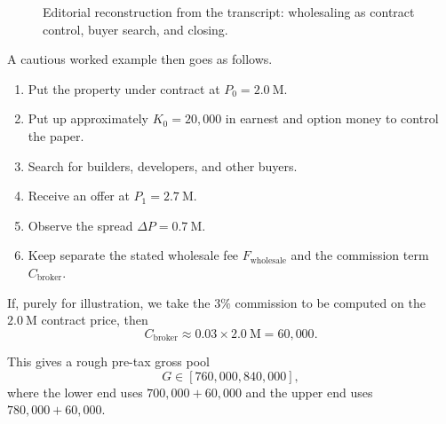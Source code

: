 \begin{figure}[h]
\centering
{}
\caption{Editorial reconstruction from the transcript: wholesaling as contract control, buyer search, and closing.}
\end{figure}

A cautious worked example then goes as follows.
\begin{enumerate}
\item Put the property under contract at \(P_0=2.0\ \mathrm{M}\).
\item Put up approximately \(K_0=20{,}000\) in earnest and option money to control the paper.
\item Search for builders, developers, and other buyers.
\item Receive an offer at \(P_1=2.7\ \mathrm{M}\).
\item Observe the spread \(\Delta P=0.7\ \mathrm{M}\).
\item Keep separate the stated wholesale fee \(F_{\mathrm{wholesale}}\) and the commission term \(C_{\mathrm{broker}}\).
\end{enumerate}

If, purely for illustration, we take the \(3\%\) commission to be computed on the \(2.0\ \mathrm{M}\) contract price, then
\begin{equation}
C_{\mathrm{broker}} \approx 0.03\times 2.0\ \mathrm{M} = 60{,}000.
\end{equation}

This gives a rough pre-tax gross pool
\begin{equation}
G \in [760{,}000,840{,}000],
\end{equation}
where the lower end uses \(700{,}000+60{,}000\) and the upper end uses \(780{,}000+60{,}000\).

